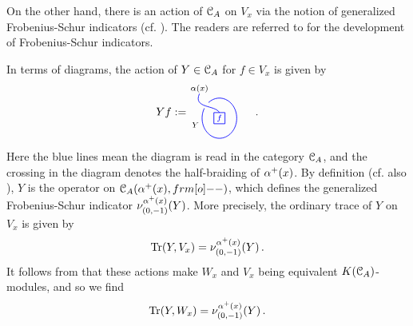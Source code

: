 \documentclass{amsart}
\begin{document}
On the other hand, there is an action of ${{\EuScript{C}}_A}$ on $V_x$ via the notion of generalized Frobenius-Schur indicators (cf. \cite[Sec. 2]{NS10}). The readers are referred to \cite{NSind, NS07, NS10, MNg, LM, KSZ, SZ, FGSV} for the development of Frobenius-Schur indicators.

    In terms of diagrams, the action of $Y \in {{\EuScript{C}}_A}$ for $f\in V_x$ is given by
\begin{equation}\label{eq: indicator_diag}
Yf:=\vcenter{\hbox{%
\begin{tikzpicture}[x=1pc, y=1pc, line width=0.6pt]
  \draw[blue] ({1.3*cos(150.64649)},{1.5*sin(150.64649)})
    arc[start angle=150.64649, end angle=489.09356,
        x radius=1.3pc, y radius=1.5pc];

  \node[draw=blue, text=blue, minimum width=10pt, minimum height=10pt,
        inner sep=0pt, outer sep=0pt] (Yf box) at (0,0)
    {$\scriptstyle f$};

  \node[inner sep=1pt, outer sep=0pt] (Yf input) at (-1.5,2.2)
    {$\scriptstyle\alpha(x)$};
  \draw[blue] (Yf box.north)
    .. controls (-0.3,1) and (-2,0.7) .. (Yf input.south);

  \node[inner sep=1pt, outer sep=0pt] at (-1.8,-0.5)
    {$\scriptstyle Y$};
\end{tikzpicture}%
}}\hspace{0.5cm}.
\end{equation}
Here the blue lines mean the diagram is read in the category ${{\EuScript{C}}_A}$, and the crossing in the diagram denotes the half-braiding of ${\alpha}^+(x)$.
By definition \cite[Sec. 2]{NS10} (cf. also \cite[Defn. 3.1]{DNRX2025}), $Y$ is the operator on $\CA(\a^+(x), \1)$, which defines the generalized Frobenius-Schur indicator $\nu_{(0,-1)}^{{\alpha}^+(x)}(Y)$.  More precisely, the ordinary trace of $Y$ on $V_x$ is given by
\begin{equation}\label{eq:GSFTrace}
    \operatorname{Tr}(Y, V_x) = \nu_{(0,-1)}^{{\alpha}^+(x)}(Y) \,.
\end{equation}
It follows from \cite{DNRX2025} that these actions make $W_x$ and $V_x$ being equivalent $K({{\EuScript{C}}_A})$-modules, and so we find
\begin{equation}\label{eq:GSFTrace}
    \operatorname{Tr}(Y, W_x) = \nu_{(0,-1)}^{{\alpha}^+(x)}(Y) \,.
\end{equation}
\end{document}
